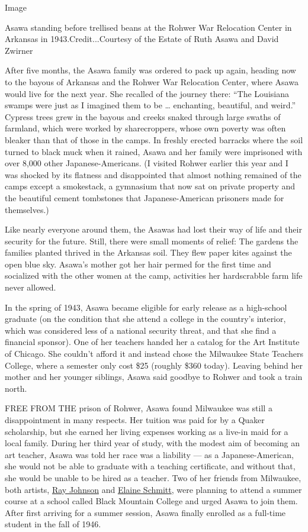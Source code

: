 Image

Asawa standing before trellised beans at the Rohwer War Relocation
Center in Arkansas in 1943.Credit...Courtesy of the Estate of Ruth Asawa
and David Zwirner

After five months, the Asawa family was ordered to pack up again,
heading now to the bayous of Arkansas and the Rohwer War Relocation
Center, where Asawa would live for the next year. She recalled of the
journey there: ``The Louisiana swamps were just as I imagined them to be
\ldots{} enchanting, beautiful, and weird.'' Cypress trees grew in the
bayous and creeks snaked through large swaths of farmland, which were
worked by sharecroppers, whose own poverty was often bleaker than that
of those in the camps. In freshly erected barracks where the soil turned
to black muck when it rained, Asawa and her family were imprisoned with
over 8,000 other Japanese-Americans. (I visited Rohwer earlier this year
and I was shocked by its flatness and disappointed that almost nothing
remained of the camps except a smokestack, a gymnasium that now sat on
private property and the beautiful cement tombstones that
Japanese-American prisoners made for themselves.)

Like nearly everyone around them, the Asawas had lost their way of life
and their security for the future. Still, there were small moments of
relief: The gardens the families planted thrived in the Arkansas soil.
They flew paper kites against the open blue sky. Asawa's mother got her
hair permed for the first time and socialized with the other women at
the camp, activities her hardscrabble farm life never allowed.

In the spring of 1943, Asawa became eligible for early release as a
high-school graduate (on the condition that she attend a college in the
country's interior, which was considered less of a national security
threat, and that she find a financial sponsor). One of her teachers
handed her a catalog for the Art Institute of Chicago. She couldn't
afford it and instead chose the Milwaukee State Teachers College, where
a semester only cost \$25 (roughly \$360 today). Leaving behind her
mother and her younger siblings, Asawa said goodbye to Rohwer and took a
train north.

FREE FROM THE prison of Rohwer, Asawa found Milwaukee was still a
disappointment in many respects. Her tuition was paid for by a Quaker
scholarship, but she earned her living expenses working as a live-in
maid for a local family. During her third year of study, with the modest
aim of becoming an art teacher, Asawa was told her race was a liability
--- as a Japanese-American, she would not be able to graduate with a
teaching certificate, and without that, she would be unable to be hired
as a teacher. Two of her friends from Milwaukee, both artists,
\href{https://www.nytimes.com/2015/01/11/arts/design/ray-johnson-defies-categories-20-years-after-his-death.html}{Ray
Johnson} and
\href{http://www.blackmountaincollege.org/elaine-schmitt-urbain/}{Elaine
Schmitt}, were planning to attend a summer course at a school called
Black Mountain College and urged Asawa to join them. After first
arriving for a summer session, Asawa finally enrolled as a full-time
student in the fall of 1946.

